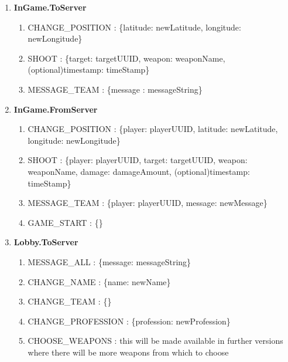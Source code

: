 \documentclass{article}
\begin{document}
\begin{enumerate}
  \item \textbf{InGame.ToServer}  
  \begin{enumerate}
    \item CHANGE\_POSITION :
    \{latitude: newLatitude, longitude: newLongitude\}
    
    \item SHOOT :
    \{target: targetUUID, weapon: weaponName, (optional)timestamp: timeStamp\}
        
    \item MESSAGE\_TEAM :
    \{message : messageString\}
      
  \end{enumerate}  
  
  \item \textbf{InGame.FromServer}  
  \begin{enumerate}
    \item CHANGE\_POSITION :
    \{player: playerUUID, latitude: newLatitude, longitude: newLongitude\}
    
    \item SHOOT :
    \{player: playerUUID, target: targetUUID, weapon: weaponName, damage:    
    damageAmount, (optional)timestamp: timeStamp\}
    
    \item MESSAGE\_TEAM :
    \{player: playerUUID, message: newMessage\}
    
    \item GAME\_START :
    \{\} 
        
  \end{enumerate}  
  
  \item \textbf{Lobby.ToServer}
  
  \begin{enumerate}
    
    \item MESSAGE\_ALL :
    \{message: messageString\}
    
	\item CHANGE\_NAME :
	\{name: newName\}
			
	\item CHANGE\_TEAM :
	\{\}		
	
	\item CHANGE\_PROFESSION :
	\{profession: newProfession\}
	
	\item CHOOSE\_WEAPONS :
	this will be made available in further versions where there will be more
	weapons from which to choose
	

\end{enumerate}
\end{enumerate}
\end{document}
